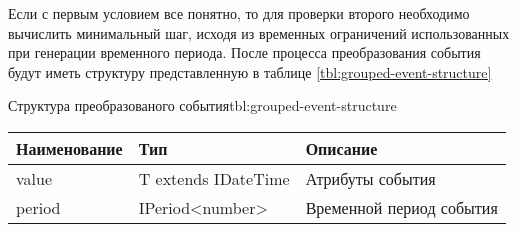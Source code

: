 Если с первым условием все понятно, то для проверки второго необходимо вычислить минимальный шаг, исходя из временных ограничений использованных при генерации временного периода.
После процесса преобразования события будут иметь структуру представленную в таблице \ref{tbl:grouped-event-structure}

\begin{tbl}{Структура преобразованого события}{tbl:grouped-event-structure}
  \begin{tabularx}{\textwidth}{| p{3cm} | p{4cm} | X |}
    \hline Наименование & Тип                  & Описание                 \\
    \hline value        & T extends IDateTime  & Атрибуты события         \\
    \hline period       & IPeriod<number>      & Временной период события \\
    \hline
    \end{tabularx}
\end{tbl}
